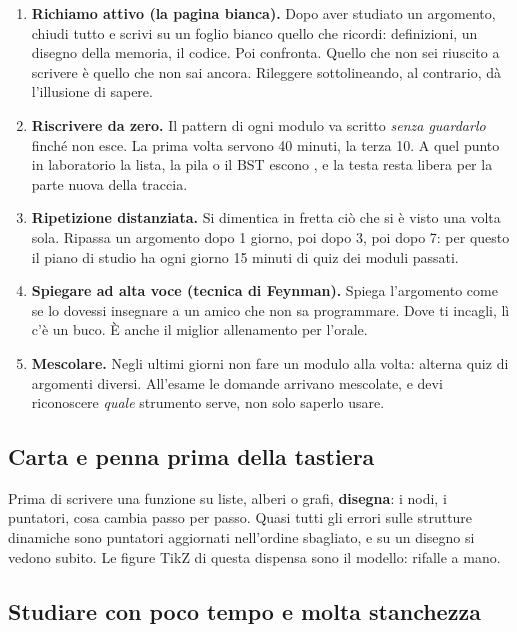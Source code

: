 \begin{passopasso}[: le tecniche]
\begin{enumerate}
  \item \textbf{Richiamo attivo (la pagina bianca).} Dopo aver studiato un argomento,
        chiudi tutto e scrivi su un foglio bianco quello che ricordi: definizioni, un
        disegno della memoria, il codice. Poi confronta. Quello che non sei riuscito a
        scrivere è quello che non sai ancora. Rileggere sottolineando, al contrario, dà
        l'illusione di sapere.
  \item \textbf{Riscrivere da zero.} Il pattern di ogni modulo va scritto \emph{senza
        guardarlo} finché non esce. La prima volta servono 40 minuti, la terza 10. A
        quel punto in laboratorio la lista, la pila o il BST escono , e la
        testa resta libera per la parte nuova della traccia.
  \item \textbf{Ripetizione distanziata.} Si dimentica in fretta ciò che si è visto una
        volta sola. Ripassa un argomento dopo 1 giorno, poi dopo 3, poi dopo 7: per
        questo il piano di studio ha ogni giorno 15 minuti di quiz dei moduli passati.
  \item \textbf{Spiegare ad alta voce (tecnica di Feynman).} Spiega l'argomento come se
        lo dovessi insegnare a un amico che non sa programmare. Dove ti incagli, lì c'è un
        buco. È anche il miglior allenamento per l'orale.
  \item \textbf{Mescolare.} Negli ultimi giorni non fare un modulo alla volta: alterna
        quiz di argomenti diversi. All'esame le domande arrivano mescolate, e devi
        riconoscere \emph{quale} strumento serve, non solo saperlo usare.
\end{enumerate}
\end{passopasso}

\subsection*{Carta e penna prima della tastiera}

Prima di scrivere una funzione su liste, alberi o grafi, \textbf{disegna}: i nodi, i
puntatori, cosa cambia passo per passo. Quasi tutti gli errori sulle strutture dinamiche
sono puntatori aggiornati nell'ordine sbagliato, e su un disegno si vedono subito. Le
figure TikZ di questa dispensa sono il modello: rifalle a mano.

\subsection*{Studiare con poco tempo e molta stanchezza}

